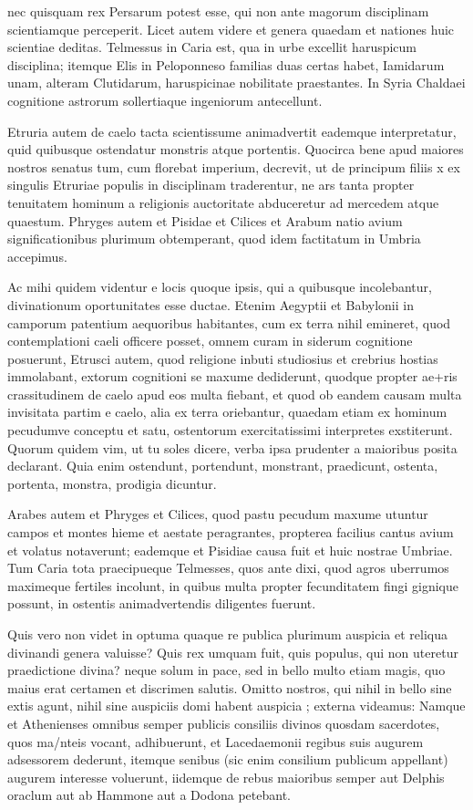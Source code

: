  nec quisquam rex Persarum potest esse, qui non ante magorum disciplinam scientiamque perceperit. Licet autem videre et genera quaedam et nationes huic scientiae deditas. Telmessus in Caria est, qua in urbe excellit haruspicum disciplina; itemque Elis in Peloponneso familias duas certas habet, Iamidarum unam, alteram Clutidarum, haruspicinae nobilitate praestantes. In Syria Chaldaei cognitione astrorum sollertiaque ingeniorum antecellunt.

 Etruria autem de caelo tacta scientissume animadvertit eademque interpretatur, quid quibusque ostendatur monstris atque portentis. Quocirca bene apud maiores nostros senatus tum, cum florebat imperium, decrevit, ut de principum filiis x ex singulis Etruriae populis in disciplinam traderentur, ne ars tanta propter tenuitatem hominum a religionis auctoritate abduceretur ad mercedem atque quaestum. Phryges autem et Pisidae et Cilices et Arabum natio avium significationibus plurimum obtemperant, quod idem factitatum in Umbria accepimus.

 Ac mihi quidem videntur e locis quoque ipsis, qui a quibusque incolebantur, divinationum oportunitates esse ductae. Etenim Aegyptii et Babylonii in camporum patentium aequoribus habitantes, cum ex terra nihil emineret, quod contemplationi caeli officere posset, omnem curam in siderum cognitione posuerunt, Etrusci autem, quod religione inbuti studiosius et crebrius hostias immolabant, extorum cognitioni se maxume dediderunt, quodque propter ae+ris crassitudinem de caelo apud eos multa fiebant, et quod ob eandem causam multa invisitata partim e caelo, alia ex terra oriebantur, quaedam etiam ex hominum pecudumve conceptu et satu, ostentorum exercitatissimi interpretes exstiterunt. Quorum quidem vim, ut tu soles dicere, verba ipsa prudenter a maioribus posita declarant. Quia enim ostendunt, portendunt, monstrant, praedicunt, ostenta, portenta, monstra, prodigia dicuntur.

 Arabes autem et Phryges et Cilices, quod pastu pecudum maxume utuntur campos et montes hieme et aestate peragrantes, propterea facilius cantus avium et volatus notaverunt; eademque et Pisidiae causa fuit et huic nostrae Umbriae. Tum Caria tota praecipueque Telmesses, quos ante dixi, quod agros uberrumos maximeque fertiles incolunt, in quibus multa propter fecunditatem fingi gignique possunt, in ostentis animadvertendis diligentes fuerunt.

 Quis vero non videt in optuma quaque re publica plurimum auspicia et reliqua divinandi genera valuisse? Quis rex umquam fuit, quis populus, qui non uteretur praedictione divina? neque solum in pace, sed in bello multo etiam magis, quo maius erat certamen et discrimen salutis. Omitto nostros, qui nihil in bello sine extis agunt, nihil sine auspiciis domi habent auspicia ; externa videamus: Namque et Athenienses omnibus semper publicis consiliis divinos quosdam sacerdotes, quos ma/nteis vocant, adhibuerunt, et Lacedaemonii regibus suis augurem adsessorem dederunt, itemque senibus (sic enim consilium publicum appellant) augurem interesse voluerunt, iidemque de rebus maioribus semper aut Delphis oraclum aut ab Hammone aut a Dodona petebant.

